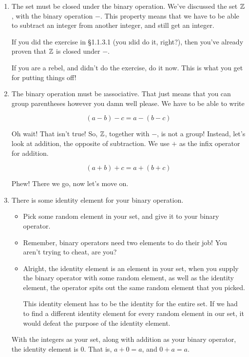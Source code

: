\begin{enumerate}
\item The set must be closed under the binary operation. We've discussed the set
  $\mathbb{Z}$, with the binary operation $-$. This property means that we have to be
  able to subtract an integer from another integer, and still get an integer.

  If you did the exercise in \S 1.1.3.1 (you \i{did} do it, right?), then you've
  already proven that $\mathbb{Z}$ is closed under $-$.
  
  If you are a rebel, and didn't do the exercise, do it now. This is what you
  get for putting things off!

\item The binary operation must be \i{associative}. That just means that you can
  group parentheses however you damn well please.  We have to be able to write

  \[ (a - b) - c = a - (b - c) \]

  Oh wait! That isn't true! So, $\mathbb{Z}$, together with $-$, is not a group!
  Instead, let's look at addition, the opposite of subtraction. We use $+$ as
  the infix operator for addition. 
  
  \[ (a + b) + c = a + (b + c) \]
  
  Phew! There we go, now let's move on.

\item There is some identity element for your binary operation. 

  \begin{itemize}
  \item Pick some random element in your set, and give it to your binary
    operator. 
  \item Remember, binary operators need two elements to do their job! You aren't
    trying to cheat, are you?
  \item Alright, the identity element is an element in your set, when you supply
    the binary operator with some random element, as well as the identity
    element, the operator spits out the same random element that you picked. 

    This identity element has to be the identity for the entire set. If we had
    to find a different identity element for every random element in our set, it
    would defeat the purpose of the identity element.
  \end{itemize}

  With the integers as your set, along with addition as your binary operator,
  the identity element is $0$. That is, $a + 0 = a$, and $0 + a = a$.
  

\end{enumerate}
